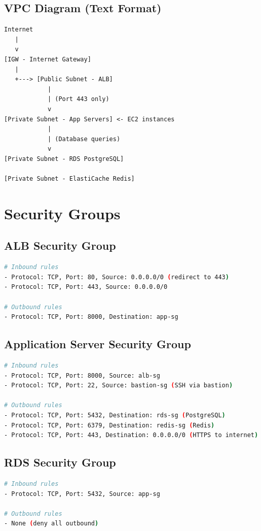 \documentclass{report}
\begin{document}
\subsection{VPC Diagram (Text Format)}
\begin{lstlisting}
Internet
   |
   v
[IGW - Internet Gateway]
   |
   +---> [Public Subnet - ALB]
            |
            | (Port 443 only)
            v
[Private Subnet - App Servers] <- EC2 instances
            |
            | (Database queries)
            v
[Private Subnet - RDS PostgreSQL]

[Private Subnet - ElastiCache Redis]
\end{lstlisting}

\section{Security Groups}

\subsection{ALB Security Group}
\begin{lstlisting}[language=bash]
# Inbound rules
- Protocol: TCP, Port: 80, Source: 0.0.0.0/0 (redirect to 443)
- Protocol: TCP, Port: 443, Source: 0.0.0.0/0

# Outbound rules
- Protocol: TCP, Port: 8000, Destination: app-sg
\end{lstlisting}

\subsection{Application Server Security Group}
\begin{lstlisting}[language=bash]
# Inbound rules
- Protocol: TCP, Port: 8000, Source: alb-sg
- Protocol: TCP, Port: 22, Source: bastion-sg (SSH via bastion)

# Outbound rules
- Protocol: TCP, Port: 5432, Destination: rds-sg (PostgreSQL)
- Protocol: TCP, Port: 6379, Destination: redis-sg (Redis)
- Protocol: TCP, Port: 443, Destination: 0.0.0.0/0 (HTTPS to internet)
\end{lstlisting}

\subsection{RDS Security Group}
\begin{lstlisting}[language=bash]
# Inbound rules
- Protocol: TCP, Port: 5432, Source: app-sg

# Outbound rules
- None (deny all outbound)
\end{lstlisting}
\end{document}
